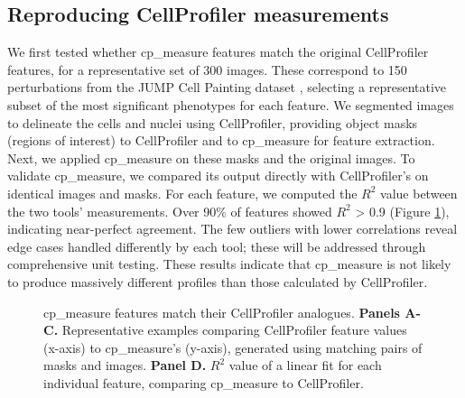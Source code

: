 \documentclass{article}
\begin{document}
\subsection{Reproducing CellProfiler measurements}
\label{sec:org09b0cd2}
We first tested whether cp\_measure features match the original CellProfiler features, for a representative set of 300 images. These correspond to 150 perturbations from the JUMP Cell Painting dataset \citep{chandrasekaranJUMPCellPainting2023}, selecting a representative subset of the most significant phenotypes for each feature. We segmented images to delineate the cells and nuclei using CellProfiler, providing object masks (regions of interest) to CellProfiler and to cp\_measure for feature extraction. Next, we applied cp\_measure on these masks and the original images. 
To validate cp\_measure, we compared its output directly with CellProfiler's on identical images and masks. 
For each feature, we computed the $R^2$ value between the two tools' measurements. 
Over 90\% of features showed $R^2$ > 0.9 (Figure \ref{fig:cp_vs_cpmeasure}), indicating near-perfect agreement. 
The few outliers with lower correlations reveal edge cases handled differently by each tool; these will be addressed through comprehensive unit testing.
These results indicate that cp\_measure is not likely to produce massively different profiles than those calculated by CellProfiler.

\begin{figure}[htbp]
\centering

\caption{\label{fig:cp_vs_cpmeasure}cp\_measure features match their CellProfiler analogues. \textbf{Panels A-C.} Representative examples comparing CellProfiler feature values (x-axis) to cp\_measure's (y-axis), generated using matching pairs of masks and images. \textbf{Panel D.} \(R^2\) value of a linear fit for each individual feature, comparing cp\_measure to CellProfiler.}
\end{figure}
\end{document}
